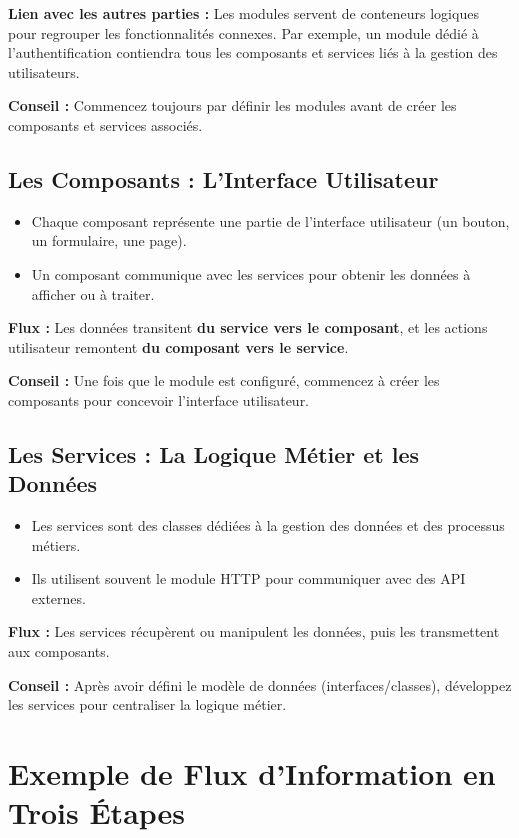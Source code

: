 \documentclass{article}
\begin{document}
\textbf{Lien avec les autres parties :}  
Les modules servent de conteneurs logiques pour regrouper les fonctionnalités connexes. Par exemple, un module dédié à l’authentification contiendra tous les composants et services liés à la gestion des utilisateurs.

\textbf{Conseil :} Commencez toujours par définir les modules avant de créer les composants et services associés.

\subsection{Les Composants : L’Interface Utilisateur}
\begin{itemize}
    \item Chaque composant représente une partie de l’interface utilisateur (un bouton, un formulaire, une page).
    \item Un composant communique avec les services pour obtenir les données à afficher ou à traiter.
\end{itemize}

\textbf{Flux :}  
Les données transitent \textbf{du service vers le composant}, et les actions utilisateur remontent \textbf{du composant vers le service}.

\textbf{Conseil :} Une fois que le module est configuré, commencez à créer les composants pour concevoir l’interface utilisateur.

\subsection{Les Services : La Logique Métier et les Données}
\begin{itemize}
    \item Les services sont des classes dédiées à la gestion des données et des processus métiers.
    \item Ils utilisent souvent le module HTTP pour communiquer avec des API externes.
\end{itemize}

\textbf{Flux :}  
Les services récupèrent ou manipulent les données, puis les transmettent aux composants.

\textbf{Conseil :} Après avoir défini le modèle de données (interfaces/classes), développez les services pour centraliser la logique métier.

\section{Exemple de Flux d’Information en Trois Étapes}
\end{document}
